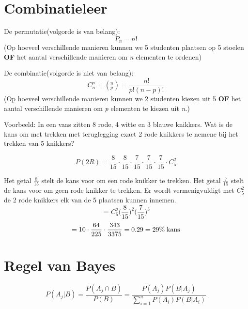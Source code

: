 \documentclass[12pt]{report}
\newcommand{\example}[2]{
      \hrulefill
      
      Voorbeeld: #1
      
      #2
      
      \hrulefill
  }
\begin{document}
\section{Combinatieleer}
De permutatie(volgorde is van belang): $$P_n = n!$$ (Op hoeveel verschillende manieren kunnen we 5 studenten plaatsen op 5 stoelen \textbf{OF} het aantal verschillende manieren om \textit{n} elementen te ordenen)


De combinatie(volgorde is niet van belang): $$C_n^p = (_p^n) = \frac{n!}{p!(n - p)!}$$ (Op hoeveel verschillende manieren kunnen we 2 studenten kiezen uit 5 \textbf{OF} het aantal verschillende manieren om \textit{p} elementen te kiezen uit \textit{n}.)

\example{In een vaas zitten 8 rode, 4 witte en 3 blauwe knikkers. Wat is de kans om met trekken met teruglegging exact 2 rode knikkers te nemene bij het trekken van 5 knikkers?}{
	$$P(2R) = \frac{8}{15} \cdot \frac{8}{15} \cdot \frac{7}{15} \cdot \frac{7}{15} \cdot \frac{7}{15} \cdot C_5^2$$
	
	Het getal $\frac{8}{15}$ stelt de kans voor om een rode knikker te trekken. Het getal $\frac{7}{15}$ stelt de kans voor om geen rode knikker te trekken. Er wordt vermenigvuldigt met $C_5^2$ de 2 rode knikkers elk van de 5 plaatsen kunnen innemen.
	$$=C_5^2 \bigg(\frac{8}{15}\bigg)^2\bigg(\frac{7}{15}\bigg)^3$$
	$$= 10 \cdot \frac{64}{225} \cdot \frac{343}{3375} = 0.29 = 29\%\; \hbox{kans}$$
	
}

\section{Regel van Bayes}
$$P(A_j|B) = \frac{P(A_j \cap B)}{P(B)} = \frac{P(A_j)P(B|A_j)}{\sum_{i = 1}^{n}P(A_i)P(B|A_i)}$$
\end{document}
